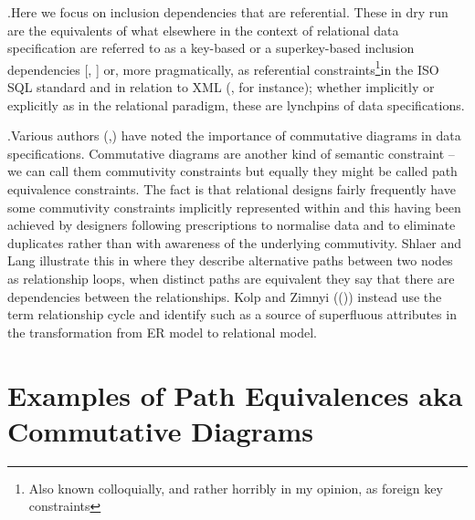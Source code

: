 \documentclass[10pt,a4paper]{article}
\theoremstyle{remark}
\newlength{\oldparindent}
\newcommand{\ind}{\hspace*{\oldparindent}}
\newcounter{para}
\newcommand\note{\par\ind\refstepcounter{para}\thepara.\space}
\begin{document}
\note Here we focus on inclusion dependencies that are referential. These in dry run are the equivalents of what elsewhere in the context of relational data specification are referred to as a key-based or a superkey-based inclusion dependencies [\cite{Mannila1986}, \cite{Levene2000}]
or, more pragmatically, as referential constraints\footnote{	Also known colloquially, and rather horribly in my opinion, as foreign key constraints}in the ISO SQL standard\cite{ISOSQL2016} and in relation to XML
(\cite{fan2003}, for instance); whether implicitly or explicitly as in the relational paradigm, these are lynchpins of  data specifications.

\note Various authors (\cite{Alderson97},\cite{Johnson93}) have noted the importance of commutative diagrams in data specifications.
Commutative diagrams are another kind of semantic constraint -- we can call them commutivity constraints but equally they might be called path equivalence constraints.  The fact is that relational designs fairly frequently have some commutivity constraints implicitly represented within  and this having been achieved  by designers following prescriptions to normalise data and to eliminate duplicates rather than with awareness of the underlying commutivity. 
Shlaer and Lang illustrate this in \cite{Shlaer96} where they describe alternative paths between two nodes as
relationship loops, when distinct paths are equivalent they say that there are dependencies
between the relationships. Kolp and Zimnyi ((\cite{Kolp1995})) instead use the term
relationship cycle and identify such as a source of superfluous attributes in the
transformation from ER model to relational model.



\section{Examples of Path Equivalences aka Commutative Diagrams}
\end{document}
